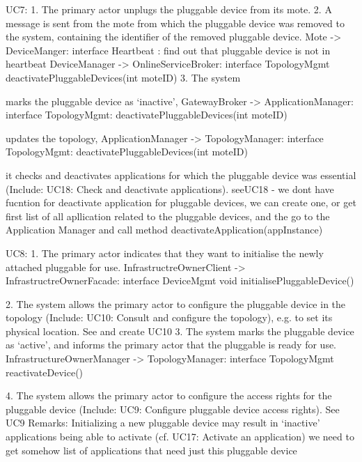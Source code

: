      UC7:
        1. The primary actor unplugs the pluggable device from its mote.
        2. A message is sent from the mote from which the pluggable device was removed to the system,
            containing the identifier of the removed pluggable device.
            Mote -> DeviceManger: interface Heartbeat : find out that pluggable device is not in heartbeat
            DeviceManager -> OnlineServiceBroker: interface TopologyMgmt deactivatePluggableDevices(int moteID)
        3. The system
        { marks the pluggable device as `inactive',
           GatewayBroker -> ApplicationManager: interface TopologyMgmt: deactivatePluggableDevices(int moteID)
        { updates the topology,
           ApplicationManager -> TopologyManager: interface TopologyMgmt: deactivatePluggableDevices(int moteID)
        { it checks and deactivates applications for which the pluggable device was essential
        (Include: UC18: Check and deactivate applications).
        seeUC18 - we dont have fucntion for deactivate application for pluggable devices, we can create one, or get
                            first list of all apllication related to the pluggable devices, and the go to the Application Manager and
                            call method deactivateApplication(appInstance)

     UC8:
        1. The primary actor indicates that they want to initialise the newly attached pluggable for use.
            InfrastructreOwnerClient -> InfrastructreOwnerFacade: interface DeviceMgmt
                                void initialisePluggableDevice()

        2. The system allows the primary actor to configure the pluggable device in the topology
            (Include: UC10: Consult and configure the topology), e.g. to set its physical location.
             See and create UC10
        3. The system marks the pluggable device as `active', and informs the primary actor that the
            pluggable is ready for use.
            InfrastructureOwnerManager -> TopologyManager: interface TopologyMgmt reactivateDevice()

        4. The system allows the primary actor to configure the access rights for the pluggable device
            (Include: UC9: Configure pluggable device access rights).
            See UC9
         Remarks:
            Initializing a new pluggable device may result in `inactive' applications being able to activate
            (cf. UC17: Activate an application) we need to get somehow list of applications that need just this pluggable device

}}}
